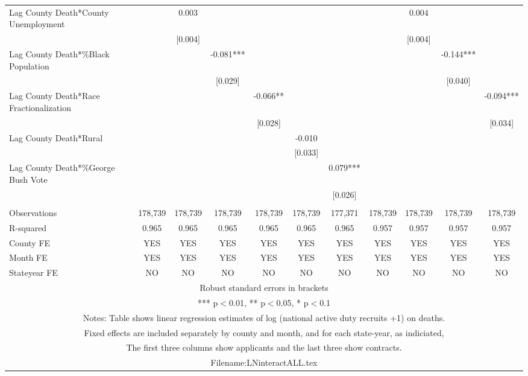 \documentclass[]{article}
\begin{document}
\begin{tabular}{lcccccccccc}
Lag County Death*County Unemployment &  & 0.003 &  &  &  &  &  & 0.004 &  &  \\
 &  & [0.004] &  &  &  &  &  & [0.004] &  &  \\
Lag County Death*\%Black Population &  &  & -0.081*** &  &  &  &  &  & -0.144*** &  \\
 &  &  & [0.029] &  &  &  &  &  & [0.040] &  \\
Lag County Death*Race Fractionalization &  &  &  & -0.066** &  &  &  &  &  & -0.094*** \\
 &  &  &  & [0.028] &  &  &  &  &  & [0.034] \\
Lag County Death*Rural &  &  &  &  & -0.010 &  &  &  &  &  \\
 &  &  &  &  & [0.033] &  &  &  &  &  \\
Lag County Death*\%George Bush Vote &  &  &  &  &  & 0.079*** &  &  &  &  \\
 &  &  &  &  &  & [0.026] &  &  &  &  \\
 &  &  &  &  &  &  &  &  &  &  \\
Observations & 178,739 & 178,739 & 178,739 & 178,739 & 178,739 & 177,371 & 178,739 & 178,739 & 178,739 & 178,739 \\
R-squared & 0.965 & 0.965 & 0.965 & 0.965 & 0.965 & 0.965 & 0.957 & 0.957 & 0.957 & 0.957 \\
County FE & YES & YES & YES & YES & YES & YES & YES & YES & YES & YES \\
Month FE & YES & YES & YES & YES & YES & YES & YES & YES & YES & YES \\
 Stateyear FE & NO & NO & NO & NO & NO & NO & NO & NO & NO & NO \\ \hline
\multicolumn{11}{c}{ Robust standard errors in brackets} \\
\multicolumn{11}{c}{ *** p$<$0.01, ** p$<$0.05, * p$<$0.1} \\
\multicolumn{11}{c}{ Notes: Table shows linear regression estimates of log (national active duty recruits +1) on deaths.} \\
\multicolumn{11}{c}{ Fixed effects are included separately by county and month, and for each state-year, as indiciated,} \\
\multicolumn{11}{c}{ The first three columns show applicants and the last three show contracts.} \\
\multicolumn{11}{c}{ Filename:LNinteractALL.tex} \\
\end{tabular}
\end{document}
